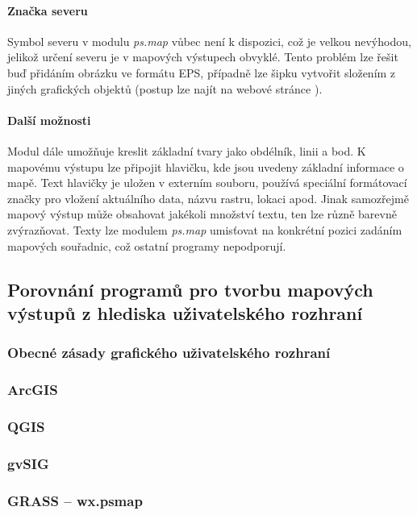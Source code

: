 \documentclass[a4paper,12pt,draft]{article}
\newcommand{\modul}[1]{\emph{#1}}
\begin{document}
\paragraph*{Značka severu}
Symbol severu v modulu \modul{ps.map} vůbec není k dispozici, což je velkou nevýhodou, jelikož určení severu je v mapových výstupech obvyklé. Tento problém lze řešit buď přidáním obrázku ve formátu EPS, případně lze šipku vytvořit složením z jiných grafických objektů (postup lze najít na webové stránce \cite{wiki_psmap_north}).

\paragraph*{Další možnosti}
Modul dále umožňuje kreslit základní tvary jako obdélník, linii a bod. K mapovému výstupu lze připojit hlavičku, kde jsou uvedeny základní informace o mapě. Text hlavičky je uložen v externím souboru, používá speciální formátovací značky pro vložení aktuálního data, názvu rastru, lokaci apod. Jinak samozřejmě mapový výstup může obsahovat jakékoli množství textu, ten lze různě barevně zvýrazňovat. Texty lze modulem \modul{ps.map} umisťovat na konkrétní pozici zadáním mapových souřadnic, což ostatní programy nepodporují. 

\subsection{Porovnání programů pro tvorbu mapových výstupů z hlediska uživatelského rozhraní }
\subsubsection{Obecné zásady grafického uživatelského rozhraní}
\subsubsection{ArcGIS}

\subsubsection{QGIS}

\subsubsection{gvSIG}

\subsubsection{GRASS -- wx.psmap}
\end{document}
